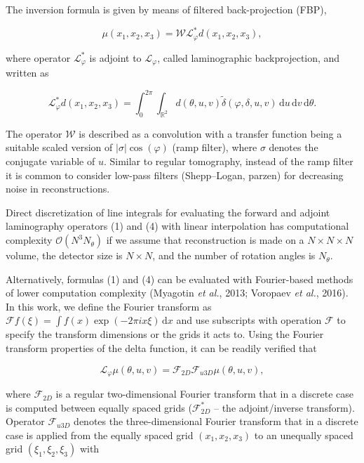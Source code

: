 \documentclass{article}
\begin{document}
The inversion formula is given by means of filtered back-projection (FBP),

\begin{equation}
\mu(x_1, x_2, x_3) = \mathcal{W} \mathcal{L}_\varphi^* d(x_1, x_2, x_3),
\tag{3}
\end{equation}

where operator $\mathcal{L}_\varphi^*$ is adjoint to $\mathcal{L}_\varphi$, called laminographic backprojection, and written as

\begin{equation}
\mathcal{L}_\varphi^* d(x_1, x_2, x_3) = \int_0^{2\pi} \int_{\mathbb{R}^2} d(\theta, u, v) \tilde{\delta}(\varphi, \delta, u, v)\, \mathrm{d}u\, \mathrm{d}v\, \mathrm{d}\theta.
\tag{4}
\end{equation}

The operator $\mathcal{W}$ is described as a convolution with a transfer function being a suitable scaled version of $|\sigma| \cos(\varphi)$ (ramp filter), where $\sigma$ denotes the conjugate variable of $u$. Similar to regular tomography, instead of the ramp filter it is common to consider low-pass filters (Shepp–Logan, parzen) for decreasing noise in reconstructions.

Direct discretization of line integrals for evaluating the forward and adjoint laminography operators (1) and (4) with linear interpolation has computational complexity $\mathcal{O}(N^3 N_\theta)$ if we assume that reconstruction is made on a $N \times N \times N$ volume, the detector size is $N \times N$, and the number of rotation angles is $N_\theta$.

Alternatively, formulas (1) and (4) can be evaluated with Fourier-based methods of lower computation complexity (Myagotin \emph{et al.}, 2013; Voropaev \emph{et al.}, 2016). In this work, we define the Fourier transform as $\mathcal{F}f(\xi) = \int f(x) \exp(-2\pi i x \xi)\, \mathrm{d}x$ and use subscripts with operation $\mathcal{F}$ to specify the transform dimensions or the grids it acts to. Using the Fourier transform properties of the delta function, it can be readily verified that

\begin{equation}
\mathcal{L}_\varphi \mu(\theta, u, v) = \mathcal{F}_{2D} \mathcal{F}_{u3D} \mu(\theta, u, v),
\tag{5}
\end{equation}

where $\mathcal{F}_{2D}$ is a regular two-dimensional Fourier transform that in a discrete case is computed between equally spaced grids ($\mathcal{F}_{2D}^*$ – the adjoint/inverse transform). Operator $\mathcal{F}_{u3D}$ denotes the three-dimensional Fourier transform that in a discrete case is applied from the equally spaced grid $(x_1, x_2, x_3)$ to an unequally spaced grid $(\xi_1, \xi_2, \xi_3)$ with
\end{document}
